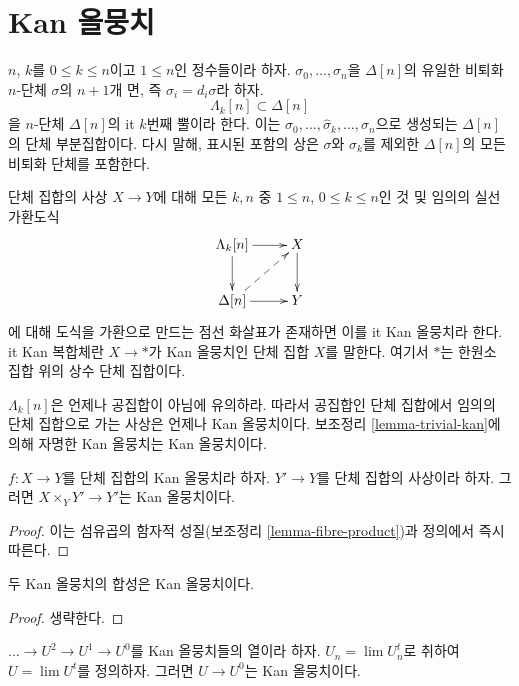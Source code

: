 \section{Kan 올뭉치}
\label{section-kan}

\noindent
$n$, $k$를 $0 \leq k \leq n$이고 $1 \leq n$인 정수들이라 하자.
$\sigma_0, \ldots, \sigma_n$을 $\Delta[n]$의 유일한 비퇴화
$n$-단체 $\sigma$의 $n + 1$개 면, 즉 $\sigma_i = d_i\sigma$라 하자.
$$
\Lambda_k[n] \subset \Delta[n]
$$
을 $n$-단체 $\Delta[n]$의 {it $k$번째 뿔}이라 한다. 이는
$\sigma_0, \ldots, \hat \sigma_k, \ldots, \sigma_n$으로 생성되는
$\Delta[n]$의 단체 부분집합이다. 다시 말해, 표시된 포함의 상은
$\sigma$와 $\sigma_k$를 제외한 $\Delta[n]$의 모든 비퇴화 단체를
포함한다.

\begin{definition}
\label{definition-kan}
단체 집합의 사상 $X \to Y$에 대해 모든 $k, n$ 중
$1 \leq n$, $0 \leq k \leq n$인 것 및 임의의 실선 가환도식
$$
\xymatrix{
\Lambda_k[n] \ar[r] \ar[d] & X \ar[d] \\
\Delta[n] \ar[r] \ar@{-->}[ru] & Y
}
$$
에 대해 도식을 가환으로 만드는 점선 화살표가 존재하면 이를
{it Kan 올뭉치}라 한다. {it Kan 복합체}란
$X \to *$가 Kan 올뭉치인 단체 집합 $X$를 말한다. 여기서 $*$는
한원소 집합 위의 상수 단체 집합이다.
\end{definition}

\noindent
$\Lambda_k[n]$은 언제나 공집합이 아님에 유의하라. 따라서 공집합인
단체 집합에서 임의의 단체 집합으로 가는 사상은 언제나 Kan 올뭉치이다.
보조정리 \ref{lemma-trivial-kan}에 의해 자명한 Kan 올뭉치는 Kan
올뭉치이다.

\begin{lemma}
\label{lemma-kan-base-change}
$f : X \to Y$를 단체 집합의 Kan 올뭉치라 하자. $Y' \to Y$를
단체 집합의 사상이라 하자. 그러면 $X \times_Y Y' \to Y'$는 Kan
올뭉치이다.
\end{lemma}

\begin{proof}
이는 섬유곱의 함자적 성질(보조정리 \ref{lemma-fibre-product})과 정의에서
즉시 따른다.
\end{proof}

\begin{lemma}
\label{lemma-kan-composition}
두 Kan 올뭉치의 합성은 Kan 올뭉치이다.
\end{lemma}

\begin{proof}
생략한다.
\end{proof}

\begin{lemma}
\label{lemma-limit-kan}
$\ldots \to U^2 \to U^1 \to U^0$를 Kan 올뭉치들의 열이라 하자.
$U_n = \lim U_n^t$로 취하여 $U = \lim U^t$를 정의하자. 그러면
$U \to U^0$는 Kan 올뭉치이다.
\end{lemma}

